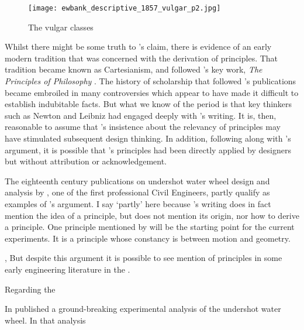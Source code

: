 \begin{figure}[ht!]
    \centering
    \texttt{[image: ewbank\_descriptive\_1857\_vulgar\_p2.jpg]}
    \caption{The vulgar classes \cite[p.~2]{ewbank_descriptive_1857}}
    \label{fig:ewbank:vulgar}
\end{figure}

Whilst there might be some truth to \citeauthor{ewbank_descriptive_1857}'s claim, there is evidence of an early modern tradition that was concerned with the derivation of principles. That tradition became known as Cartesianism, and followed \citeauthor{descartes_principles_1982}'s key work, \textit{The Principles of Philosophy} \citep{descartes_principles_1982}. The history of scholarship that followed \citeauthor{descartes_principles_1982}'s publications became embroiled in many controversies which appear to have made it difficult to establish indubitable facts. But what we know of the period is that key thinkers such as Newton and Leibniz had engaged deeply with \citeauthor{descartes_principles_1982}'s writing. It is, then, reasonable to assume that \citeauthor{descartes_principles_1982}'s insistence about the relevancy of principles may have stimulated subsequent design thinking. In addition, following along with \citeauthor{ewbank_descriptive_1857}'s argument, it is possible that \citeauthor{descartes_principles_1982}'s principles had been directly applied by designers but without attribution or acknowledgement. 

The eighteenth century publications on undershot water wheel design and analysis by \citeauthor{smeaton_experimental_1759}, one of the first professional Civil Engineers, partly qualify as examples of \citeauthor{ewbank_descriptive_1857}'s argument. I say `partly' here because \citeauthor{smeaton_experimental_1759}'s writing does in fact mention the idea of a principle, but does not mention its origin, nor how to derive a principle. One principle mentioned by \citeauthor{smeaton_experimental_1759} will be the starting point for the current experiments. It is a principle whose constancy is between motion and geometry.




, But despite this argument it is possible to see mention of principles in some early engineering literature in the . 




Regarding the 


In \citeyear{smeaton_experimental_1759} \citeauthor{smeaton_experimental_1759} published a ground-breaking experimental analysis of the undershot water wheel. In that analysis \citeyear{smeaton_experimental_1759}


